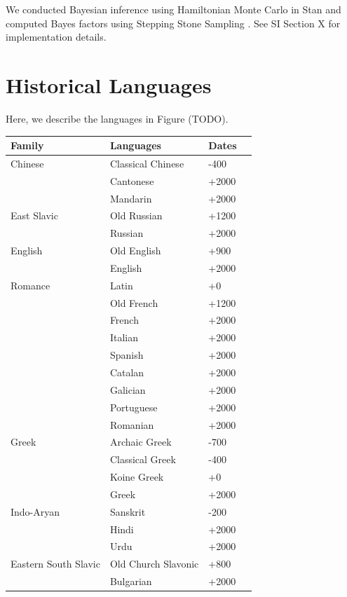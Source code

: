 \documentclass[11pt,a4paper]{article}
\begin{document}
We conducted Bayesian inference using Hamiltonian Monte Carlo in Stan \citep{homan2014the,carpenter2017stan} and computed Bayes factors using Stepping Stone Sampling \citep{xie2011improving}.
See SI Section X for implementation details.







\appendix

\section{Historical Languages}

Here, we describe the languages in Figure (TODO).

\begin{tabular}{llll} \hline
Family & Languages & Dates \\ \hline\hline
Chinese & Classical Chinese & -400  \\
& Cantonese & +2000\\ 
& Mandarin & +2000 \\ \hline
East Slavic & Old Russian & +1200 \\
& Russian & +2000 \\ \hline
English & Old English & +900 \\
& English  & +2000\\ \hline
Romance & Latin &+0  \\
& Old French &+1200\\
& French  & +2000\\
& Italian & +2000\\
& Spanish & +2000\\
& Catalan & +2000\\
& Galician & +2000\\
& Portuguese & +2000\\
& Romanian & +2000\\ \hline
Greek & Archaic Greek & -700 \\
      & Classical Greek & -400 \\
      & Koine Greek & +0\\
& Greek  & +2000\\ \hline
Indo-Aryan & Sanskrit & -200 \\
& Hindi  & +2000\\
& Urdu  & +2000\\ \hline
Eastern South Slavic & Old Church Slavonic & +800 \\
& Bulgarian  & +2000\\ \hline
\end{tabular}
\end{document}
